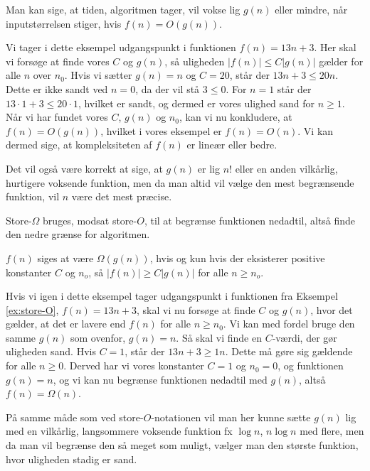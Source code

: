 Man kan sige, at tiden, algoritmen tager, vil vokse lig $g(n)$ eller mindre, når inputstørrelsen stiger, hvis $f(n)=O(g(n))$.

\begin{exmp} \label{ex:store-O}
Vi tager i dette eksempel udgangspunkt i funktionen $f(n)=13n+3$. 
Her skal vi forsøge at finde vores $C$ og $g(n)$, så uligheden $|f(n)| \leq C|g(n)|$ gælder for alle $n$ over $n_0$. Hvis vi sætter $g(n) = n$ og $C=20$, står der $13n+3 \leq 20n$. Dette er ikke sandt ved $n=0$, da der vil stå $3 \leq 0$. For $n=1$ står der $13\cdot 1 + 3 \leq 20 \cdot 1$, hvilket er sandt, og dermed er vores ulighed sand for $n \geq 1$.
Når vi har fundet vores $C$, $g(n)$ og $n_0$, kan vi nu konkludere, at $f(n) = O(g(n))$, hvilket i vores eksempel er $f(n) = O(n)$.
Vi kan dermed sige, at kompleksiteten af $f(n)$ er lineær eller bedre.
\end{exmp}
Det vil også være korrekt at sige, at $g(n)$ er lig $n!$ eller en anden vilkårlig, hurtigere voksende funktion, men da man altid vil vælge den mest begrænsende funktion, vil $n$ være det mest præcise. 

Store-$\Omega$ bruges, modsat store-$O$, til at begrænse funktionen nedadtil, altså finde den nedre grænse for algoritmen.
\begin{defn}
$f(n)$ siges at være  $\Omega(g(n))$, hvis og kun hvis der eksisterer positive konstanter $C$ og $n_o$, så $|f(n)| \geq C |g(n)|$ for alle $n \geq n_o$.
\end{defn}

\begin{exmp}
Hvis vi igen i dette eksempel tager udgangspunkt i funktionen fra Eksempel \ref{ex:store-O}, $f(n)=13n+3$, skal vi nu forsøge at finde $C$ og $g(n)$, hvor det gælder, at det er lavere end $f(n)$ for alle $n \geq n_0$. 
Vi kan med fordel bruge den samme $g(n)$ som ovenfor, $g(n)=n$. Så skal vi finde en $C$-værdi, der gør uligheden sand. Hvis $C=1$, står der $13n+3 \geq 1n$. Dette må gøre sig gældende for alle $n \geq 0$. Derved har vi vores konstanter $C=1$ og $n_0 = 0$, og funktionen $g(n)=n$, og vi kan nu begrænse funktionen nedadtil med $g(n)$, altså $f(n)=\Omega(n)$.
\end{exmp}

På samme måde som ved store-$O$-notationen vil man her kunne sætte $g(n)$ lig med en vilkårlig, langsommere voksende funktion fx $\log n$, $n \log n$ med flere, men da man vil begrænse den så meget som muligt, vælger man den største funktion, hvor uligheden stadig er sand.


